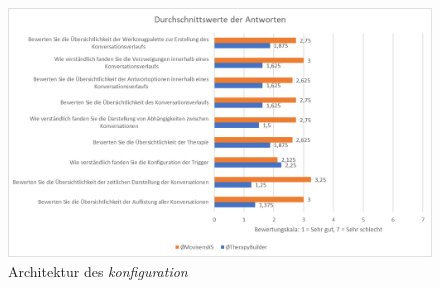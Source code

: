 \begin{figure}[h]
\centering
\includegraphics[width=1\textwidth]{pictures/diagramme/antwortendurchsch2}
\caption{Architektur des \emph{konfiguration}}
\label{antwortendurchsch22}
\end{figure}

